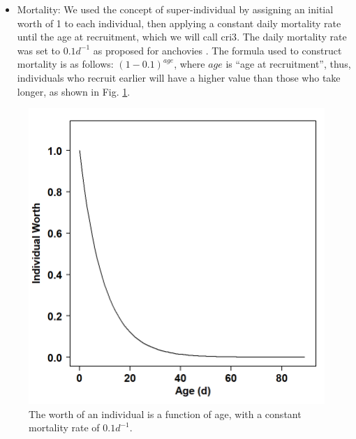\begin{itemize}
\item Mortality: We used the concept of super-individual \citep{ScheBave1995, ParrEvan2008} by assigning an initial worth of 1 to each individual, then applying a constant daily mortality rate until the age at recruitment, which we will call \gls{cri3}. The daily mortality rate was set to $0.1 d^{-1}$ as proposed for anchovies \citep{BailHoud1989, Houd2008}. The formula used to construct mortality is as follows: $(1-0.1)^{age}$, where $age$ is ``age at recruitment'', thus, individuals who recruit earlier will have a higher value than those who take longer, as shown in Fig. \ref{Chap3MortalityCurve}.

\end{itemize}

\begin{figure}[ht]
	\includegraphics[width=1.0\textwidth]{figures/Chap3MortalityCurve.png}
	\centering
	\caption{The worth of an individual is a function of age, with a constant mortality rate of $0.1 d^{-1}$.}
	\label{Chap3MortalityCurve}
\end{figure}

